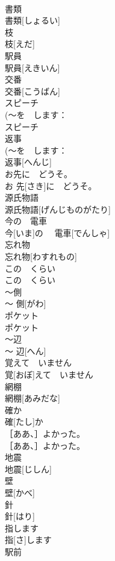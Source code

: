 \documentclass[8pt]{extreport}
\begin{document}
\begin{CJK}{UTF8}{min}
\\	書類	
\\	書類[しょるい]	
\\	枝	
\\	枝[えだ]	
\\	駅員	
\\	駅員[えきいん]	
\\	交番	
\\	交番[こうばん]	
\\	スピーチ	
\\	(〜を　します：
\\	スピーチ	
\\	返事	
\\	(〜を　します：
\\	返事[へんじ]	
\\	お先に　どうそ。	
\\	お 先[さき]に　どうそ。	
\\	源氏物語	
\\	源氏物語[げんじものがたり]	
\\	今の　電車	
\\	今[いま]の　 電車[でんしゃ]	
\\	忘れ物	
\\	忘れ物[わすれもの]	
\\	この　くらい	
\\	この　くらい	
\\	〜側	
\\	〜 側[がわ]	
\\	ポケット	
\\	ポケット	
\\	〜辺	
\\	〜 辺[へん]	
\\	覚えて　いません	
\\	覚[おぼ]えて　いません	
\\	網棚	
\\	網棚[あみだな]	
\\	確か	
\\	確[たし]か	
\\	［ああ、］よかった。	
\\	［ああ、］よかった。	
\\	地震	
\\	地震[じしん]	
\\	壁	
\\	壁[かべ]	
\\	針	
\\	針[はり]	
\\	指します	
\\	指[さ]します	
\\	駅前	

\end{CJK}
\end{document}
